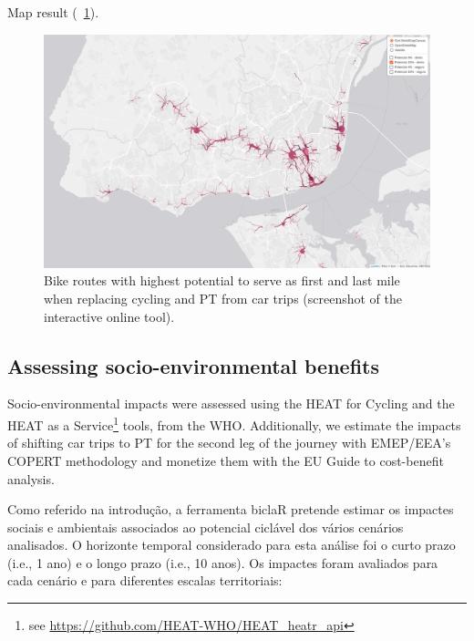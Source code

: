 \documentclass[runningheads]{llncs}
\begin{document}
Map result (~\ref{fig:map2}).

\begin{figure}
\includegraphics[width=0.8\linewidth,]{img/map2} \caption{Bike routes with highest potential to serve as first and last mile when replacing cycling and PT from car trips (screenshot of the interactive online tool).}\label{fig:map2}
\end{figure}

\hypertarget{assessing-socio-environmental-benefits}{%
\subsection{Assessing socio-environmental
benefits}\label{assessing-socio-environmental-benefits}}

Socio-environmental impacts were assessed using the HEAT for Cycling and
the HEAT as a Service\footnote{see
  \url{https://github.com/HEAT-WHO/HEAT_heatr_api}} tools, from the WHO.
Additionally, we estimate the impacts of shifting car trips to PT for
the second leg of the journey with EMEP/EEA's COPERT methodology and
monetize them with the EU Guide to cost-benefit analysis.

Como referido na introdução, a ferramenta biclaR pretende estimar os
impactes sociais e ambientais associados ao potencial ciclável dos
vários cenários analisados. O horizonte temporal considerado para esta
análise foi o curto prazo (i.e., 1 ano) e o longo prazo (i.e., 10 anos).
Os impactes foram avaliados para cada cenário e para diferentes escalas
territoriais:
\end{document}
